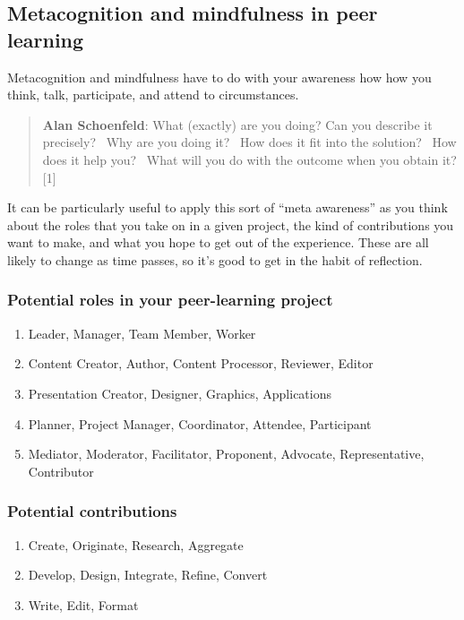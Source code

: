 \subsection{Metacognition and mindfulness in peer learning}

Metacognition and mindfulness have to do with your awareness how how you
think, talk, participate, and attend to circumstances.

\begin{quote}
\textbf{Alan Schoenfeld}: What (exactly) are you doing? Can you describe
it precisely?~ Why are you doing it?~ How does it fit into the
solution?~ How does it help you?~ What will you do with the outcome when
you obtain it? {[}1{]}
\end{quote}

It can be particularly useful to apply this sort of ``meta awareness''
as you think about the roles that you take on in a given project, the
kind of contributions you want to make, and what you hope to get out of
the experience. These are all likely to change as time passes, so it's
good to get in the habit of reflection.

\subsubsection{Potential roles in your peer-learning project}

\begin{enumerate}
\itemsep1pt\parskip0pt
\item
  Leader, Manager, Team Member, Worker
\item
  Content Creator, Author, Content Processor, Reviewer, Editor
\item
  Presentation Creator, Designer, Graphics, Applications
\item
  Planner, Project Manager, Coordinator, Attendee, Participant
\item
  Mediator, Moderator, Facilitator, Proponent, Advocate, Representative,
  Contributor
\end{enumerate}

\subsubsection{Potential contributions}

\begin{enumerate}
\itemsep1pt\parskip0pt
\item
  Create, Originate, Research, Aggregate
\item
  Develop, Design, Integrate, Refine, Convert
\item
  Write, Edit, Format
\end{enumerate}

